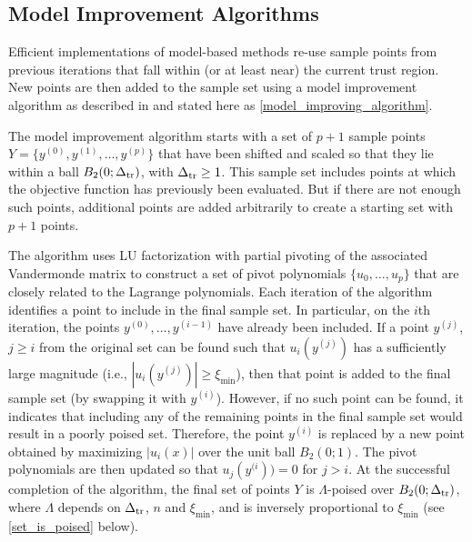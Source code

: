 \documentclass{article}
\begin{document}
\subsection{Model Improvement Algorithms}

\label{model_improvement_algorithms}
Efficient implementations of model-based methods re-use sample points from previous iterations that fall within (or at least near) the current trust region.
New points are then added to the sample set using a model improvement algorithm as described in 
\cite{introduction_book} and stated here as \cref{model_improving_algorithm}.

The model improvement algorithm starts with a set of $p+1$ sample points $Y = \{y^{(0)}, y^{(1)}, \ldots, y^{(p)}\}$ that have been shifted and scaled so that they lie within a ball $B_2(0;\Delta_{\textrm{tr}})$, with $\Delta_{\textrm{tr}} \ge 1$.     This sample set includes points at which the objective function has previously been evaluated.   But if there are not enough such points,  additional points are added arbitrarily to create a starting set with $p+1$ points. 

The algorithm uses LU factorization with partial pivoting of the 
associated Vandermonde matrix to construct a set of pivot polynomials $\{u_0, \ldots, u_p\}$ that are closely related to the Lagrange polynomials. 
Each iteration of the algorithm identifies a point to include in the final sample set.
In particular, on the $i$th iteration, the points $y^{(0)}, \ldots, y^{(i-1)}$ have already been included.   
If a point $y^{(j)}$,  $j \ge i$ from the original set can be found such that 
$u_i(y^{(j)})$ has a sufficiently large magnitude  (i.e.,  $|u_i(y^{(j)})| \ge \xi_{\min}$),  
then that point is added to the final sample set (by swapping it with $y^{(i)}$).
However, if no such point can be found, 
it indicates that including any of the remaining points in the final sample set would result in a poorly poised set.
Therefore, the point $y^{(i)}$ is replaced by a new point obtained by maximizing $|u_i(x)|$ 
over the unit ball $B_2(0;1)$.
The pivot polynomials are then updated so that 
$u_j(y^{(i})) = 0$ for $j > i$.
At the successful completion of the algorithm, the final set of points $Y$ is $\Lambda$-poised over $B_2(0;\Delta_{\textrm{tr}})$,
where $\Lambda$ depends on $\Delta_{\textrm{tr}}$,  $n$ and $\xi_{\min}$,  and is inversely proportional to $\xi_{\min}$
(see \cref{set_is_poised} below).
\end{document}

